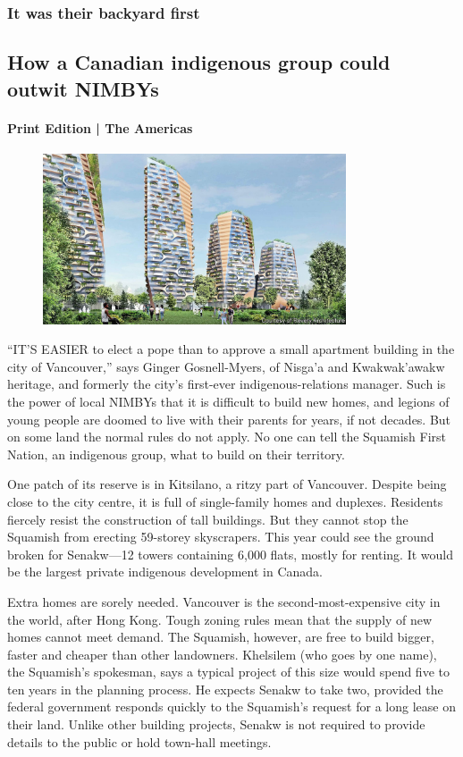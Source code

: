 \documentclass{article}
\begin{document}
\subsubsection{It was their backyard first }
\subsection{How a Canadian indigenous group could outwit NIMBYs }
\paragraph{Print Edition | The Americas  \quad \color{gray}{Mar 27th 2021 }}
\begin{figure}[h]
\centering
\includegraphics[width=0.8\textwidth]{images/20210327_AMP004_0.jpg}
\end{figure}
\lettrine{``I}T'S EASIER to elect a pope than to approve a small apartment building in the city of Vancouver,'' says Ginger Gosnell-Myers, of Nisga'a and Kwakwak'awakw heritage, and formerly the city's first-ever indigenous-relations manager. Such is the power of local NIMBYs that it is difficult to build new homes, and legions of young people are doomed to live with their parents for years, if not decades. But on some land the normal rules do not apply. No one can tell the Squamish First Nation, an indigenous group, what to build on their territory. 

One patch of its reserve is in Kitsilano, a ritzy part of Vancouver. Despite being close to the city centre, it is full of single-family homes and duplexes. Residents fiercely resist the construction of tall buildings. But they cannot stop the Squamish from erecting 59-storey skyscrapers. This year could see the ground broken for Senakw---12 towers containing 6,000 flats, mostly for renting. It would be the largest private indigenous development in Canada. 

Extra homes are sorely needed. Vancouver is the second-most-expensive city in the world, after Hong Kong. Tough zoning rules mean that the supply of new homes cannot meet demand. The Squamish, however, are free to build bigger, faster and cheaper than other landowners. Khelsilem (who goes by one name), the Squamish's spokesman, says a typical project of this size would spend five to ten years in the planning process. He expects Senakw to take two, provided the federal government responds quickly to the Squamish's request for a long lease on their land. Unlike other building projects, Senakw is not required to provide details to the public or hold town-hall meetings. 
\end{document}
